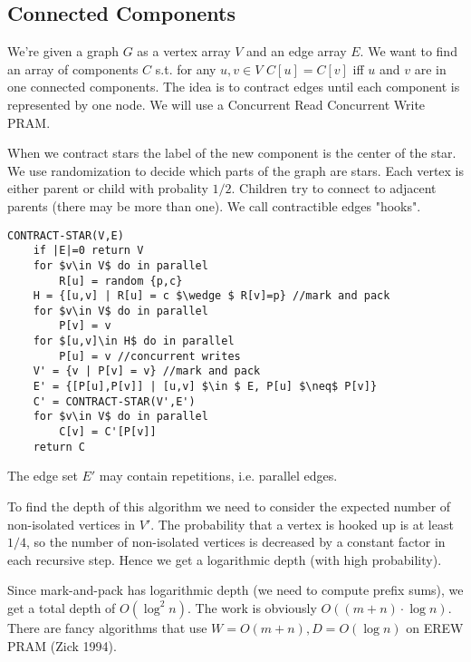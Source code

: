 \subsection{Connected Components}

We're given a graph $G$ as a vertex array $V$ and an edge array $E$. We want to find an array of components $C$ s.t. for any $u,v\in V$ $C[u] = C[v]$ iff $u$ and $v$ are in one connected components. The idea is to contract edges until each component is represented by one node. We will use a Concurrent Read Concurrent Write PRAM.

When we contract stars the label of the new component is the center of the star. We use randomization to decide which parts of the graph are stars. Each vertex is either parent or child with probality $1/2$. Children try to connect to adjacent parents (there may be more than one). We call contractible edges "hooks".

\begin{lstlisting}
CONTRACT-STAR(V,E)
	if |E|=0 return V
	for $v\in V$ do in parallel
		R[u] = random {p,c}
	H = {[u,v] | R[u] = c $\wedge $ R[v]=p} //mark and pack
	for $v\in V$ do in parallel
		P[v] = v
	for $[u,v]\in H$ do in parallel
		P[u] = v //concurrent writes
	V' = {v | P[v] = v} //mark and pack
	E' = {[P[u],P[v]] | [u,v] $\in $ E, P[u] $\neq$ P[v]}
	C' = CONTRACT-STAR(V',E')
	for $v\in V$ do in parallel
		C[v] = C'[P[v]]
	return C	
\end{lstlisting}

The edge set $E'$ may contain repetitions, i.e. parallel edges.

To find the depth of this algorithm we need to consider the expected number of non-isolated vertices in $V'$. The probability that a vertex is hooked up is at least $1/4$, so the number of non-isolated vertices is decreased by a constant factor in each recursive step. Hence we get a logarithmic depth (with high probability).

Since mark-and-pack has logarithmic depth (we need to compute prefix sums), we get a total depth of $O(\log^2 n)$. The work is obviously $O((m+n)\cdot \log n)$. There are fancy algorithms that use $W=O(m+n), D=O(\log n)$ on EREW PRAM (Zick 1994).
